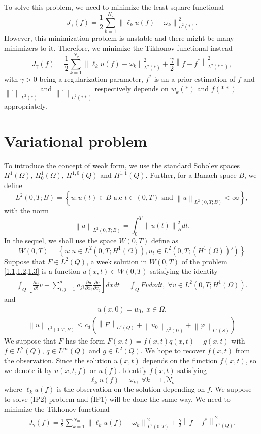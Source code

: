 \documentclass[]{article}
\begin{document}
To solve this problem, we need to minimize the least square functional 
$$J_{\gamma}(f)=\frac{1}{2}\sum_{k=1}^{N_{o}}\left\|\ell_k u(f)-\omega_k\right\|_{L^2(*)}^2.$$
However, this minimization problem is unstable and there might be many minimizers to it. Therefore, we minimize the Tikhonov functional instead
$$J_{\gamma}(f)=\frac{1}{2}\sum_{k=1}^{N_{o}}\left\|\ell_k u(f)-\omega_k\right\|_{L^2(*)}^2+\frac{\gamma}{2}\left\|f-f^*\right\|_{L^2(**)}^2,$$
with $\gamma>0$ being a regularization parameter, $f^*$ is an a prior estimation of $f$ and $\left\|.\right\|_{L^2(*)}$ and $\left\|.\right\|_{L^2(**)}$ respectively depends on $w_k(*)$ and $f(**)$ appropriately.

\section{Variational problem}
To introduce the concept of weak form, we use the standard Sobolev spaces $H^1(\Omega),\, H^1_0(\Omega),\, H^{1, 0}(Q)$ and $H^{1, 1}(Q)$. Further, for a Banach space $B$, we define
$$L^2(0, T; B)=\left\{u:u(t)\in B \text{ a.e } t\in (0, T) \text{ and } \left\|u\right\|_{L^2(0, T; B)} <\infty \right\},$$
with the norm
$$\left\|u\right\|_{L^2(0, T; B)}=\int_0^T\left\|u(t)\right\|^2_Bdt.$$
In the sequel, we shall use the space $W(0, T)$ define as
$$W(0, T)=\left\{u: u\in L^2(0, T; H^1(\Omega)), u_t\in L^2\left(0, T; \left(H^1(\Omega)\right)'\right) \right\}$$
Suppose that $F\in L^2(Q)$, a week solution in $W(0, T)$ of the problem \cref{1.1,1.2,1.3} is a function $u(x, t)\in W(0, T)$ satisfying the identity
\begin{align}\label{2.1}
	\int_{Q}\left[\frac{\partial u}{\partial t}v+\sum_{i, j=1}^{d}a_{ji}\frac{\partial u}{\partial x_i}\frac{\partial v}{\partial x_j}\right]dxdt=\int_{Q}Fvdxdt,\;\forall v \in L^2\left(0, T; H^1(\Omega)\right).
\end{align}
and 
\begin{align}\label{2.2}
	u(x, 0)=u_0,\; x\in \Omega.
\end{align}
\begin{align}\label{2.3}
	\left\|u\right\|_{L^2(0, T; B)} \leq c_d \left(\left\|F\right\|_{L^2(Q)}+\left\|u_0\right\|_{L^2(\Omega)}+\left\|\varphi\right\|_{L^2(S)}\right)
\end{align}
We suppose that $F$ has the form $F(x, t)=f(x, t)q(x, t)+g(x, t)$ with $f\in L^2(Q),\, q\in L^\infty(Q)$ and $g\in L^2(Q)$. We hope to recover $f(x, t)$ from the observation. Since the solution $u(x, t)$ depends on the function $f(x, t)$, so we denote it by $u(x, t, f)$ or $u(f)$. Identify $f(x, t)$ satisfying 
$$\ell_k u(f)=\omega_k,\; \forall k = \overline{1, N_o}$$
where $\ell_k u(f)$ is the observation on the solution depending on $f$. We suppose to solve (IP2) problem and (IP1) will be done the same way. We need to minimize the Tikhonov functional
\begin{align}\label{2.4}
	J_{\gamma}(f)=\frac{1}{2}\sum_{k=1}^{N_m}\left\|\ell_k u(f)-\omega_k\right\|_{L^2(0, T)}^2+\frac{\gamma}{2}\left\|f-f^*\right\|_{L^2(Q)}^2.
\end{align}
\end{document}
